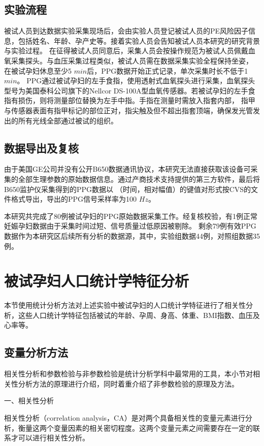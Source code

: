 \subsection{实验流程}
被试人员到达数据实验采集现场后，会由实验人员登记被试人员的PE风险因子信息，包括姓名、年龄、孕产史等。接着实验人员会告知被试人员本研究的研究背景与实验过程。
在征得被试人员同意后，采集人员会按操作规范为被试人员佩戴血氧采集探头\cite{Chen2021}。与血压采集过程类似\cite{FIGO}，被试人员需在数据采集实验全程保持坐姿，
在被试孕妇休息至少5 $min$后，PPG数据开始正式记录，单次采集时长不低于1 $min$。
PPG通过被试孕妇的左手食指，使用透射式血氧探头进行采集，血氧探头型号为美国泰科公司旗下的Nellcor DS-100A型血氧传感器。若被试孕妇的左手食指有损伤，则将测量部位替换为左手中指。手指在测量时需放入指套内部，
指甲与传感器表面有指甲标记的部位正对，指尖触及但不超出指套顶端，确保发光管发出的所有光线全部通过被试的组织。

\subsection{数据导出及复核}
由于美国GE公司并没有公开B650数据通讯协议，本研究无法直接获取该设备可采集的全部生理参数的原始数据信息。通过产商技术支持提供的第三方软件，最后将B650监护仪采集得到的PPG数据以
（时间，相对幅值）的键值对形式按CVS的文件格式导出，导出的PPG信号采样率为100 $Hz$。

本研究共完成了80例被试孕妇的PPG原始数据采集工作。经复核校验，有1例正常妊娠孕妇数据由于采集时间过短、信号质量过低原因被剔除。
剩余79例有效PPG数据作为本研究区后续所有分析的数据源，其中，实验组数据44例，对照组数据35例。
\section{被试孕妇人口统计学特征分析}
本节使用统计分析方法对上述实验中被试孕妇的人口统计学特征进行了相关性分析，这些人口统计学特征包括被试的年龄、孕周、身高、体重、BMI指数、血压及心率等。
\subsection{变量分析方法}
相关性分析和参数检验与非参数检验是统计分析学科中最常用的工具，本小节对相关性分析方法的原理进行介绍，同时着重介绍了非参数检验的原理及方法。

一、相关性分析

相关性分析（correlation analysis，CA）是对两个具备相关性的变量元素进行分析，衡量这两个变量因素的相关密切程度\cite{Zhang2019}。这两个变量元素之间需要存在一定的联系才可以进行相关性分析。

